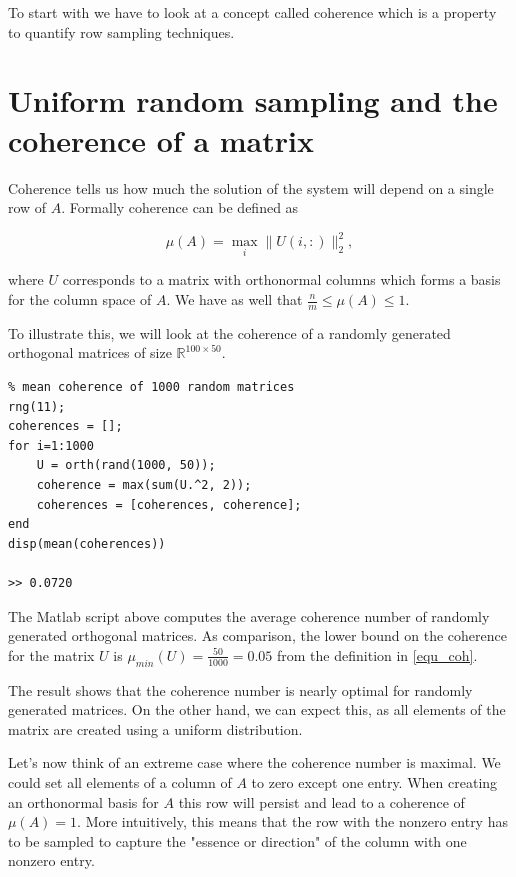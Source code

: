 \documentclass{article}
\begin{document}
To start with we have to look at a concept called coherence which is a property to quantify row sampling techniques.

\section{Uniform random sampling and the coherence of a matrix}
Coherence tells us how much the solution of the system will depend
on a single row of $A$. Formally coherence can be defined as

\begin{equation} \label{equ_coh}
\mu(A)=\max _{i}\|U(i,:)\|_{2}^{2},
\end{equation}

where $U$ corresponds to a matrix with orthonormal columns which forms a basis
for the column space of $A$. We have as well that $\frac{n}{m} \le \mu(A) \le
1$.

\bigskip

To illustrate this, we will look at the coherence of a randomly generated
orthogonal matrices of size $\mathbb{R}^{100 \times 50}$.

\begin{verbatim}
% mean coherence of 1000 random matrices
rng(11);
coherences = [];
for i=1:1000
    U = orth(rand(1000, 50));
    coherence = max(sum(U.^2, 2));
    coherences = [coherences, coherence];
end
disp(mean(coherences))

>> 0.0720
\end{verbatim}

The Matlab script above computes the average coherence number of randomly
generated orthogonal matrices. As comparison, the lower bound on the coherence
for the matrix $U$ is $\mu_{min}(U)= \frac{50}{1000} = 0.05$ from the
definition in \ref{equ_coh}.

The result shows that the coherence number is nearly optimal for randomly
generated matrices. On the other hand, we can expect this, as all
elements of the matrix are created using a uniform distribution. 

\bigskip

Let's now think of an extreme case where the coherence number is maximal. We
could set all elements of a column of $A$ to zero except one entry. When
creating an orthonormal basis for $A$ this row will persist and lead to a
coherence of $\mu(A)=1$. More intuitively, this means that the row with the
nonzero entry has to be sampled to capture the "essence or direction" of the
column with one nonzero entry.
\end{document}
